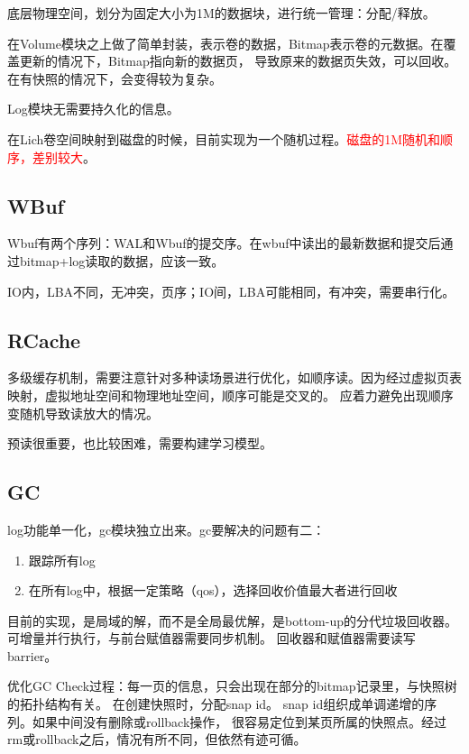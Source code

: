\documentclass[UTF8]{ctexart}
\begin{document}
底层物理空间，划分为固定大小为1M的数据块，进行统一管理：分配/释放。

在Volume模块之上做了简单封装，表示卷的数据，Bitmap表示卷的元数据。在覆盖更新的情况下，Bitmap指向新的数据页，
导致原来的数据页失效，可以回收。在有快照的情况下，会变得较为复杂。

Log模块无需要持久化的信息。

在Lich卷空间映射到磁盘的时候，目前实现为一个随机过程。\textcolor{red}{磁盘的1M随机和顺序，差别较大}。

\subsection{WBuf}

Wbuf有两个序列：WAL和Wbuf的提交序。在wbuf中读出的最新数据和提交后通过bitmap+log读取的数据，应该一致。

IO内，LBA不同，无冲突，页序；IO间，LBA可能相同，有冲突，需要串行化。

\subsection{RCache}

多级缓存机制，需要注意针对多种读场景进行优化，如顺序读。因为经过虚拟页表映射，虚拟地址空间和物理地址空间，顺序可能是交叉的。
应着力避免出现顺序变随机导致读放大的情况。

预读很重要，也比较困难，需要构建学习模型。

\subsection{GC}

log功能单一化，gc模块独立出来。gc要解决的问题有二：
\begin{enumerate}
    \item 跟踪所有log
    \item 在所有log中，根据一定策略（qos），选择回收价值最大者进行回收
\end{enumerate}

目前的实现，是局域的解，而不是全局最优解，是bottom-up的分代垃圾回收器。可增量并行执行，与前台赋值器需要同步机制。
回收器和赋值器需要读写barrier。

优化GC Check过程：每一页的信息，只会出现在部分的bitmap记录里，与快照树的拓扑结构有关。
在创建快照时，分配snap id。 snap id组织成单调递增的序列。如果中间没有删除或rollback操作，
很容易定位到某页所属的快照点。经过rm或rollback之后，情况有所不同，但依然有迹可循。
\end{document}
